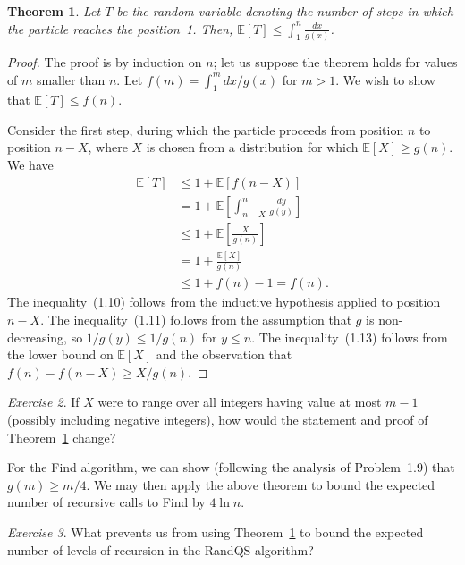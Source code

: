 \documentclass[twoside,12pt]{book}
\theoremstyle{plain}
\newtheorem{theorem}{Theorem}[chapter]
\theoremstyle{definition}
\theoremstyle{remark}
\newtheorem{exercise}[theorem]{Exercise}
\begin{document}
\begin{theorem}
\label{thm:recurrence}
Let $T$ be the random variable denoting the number of steps in which the
particle reaches the position~1.  Then,
$\mathbb{E}[T]\le \displaystyle\int_1^n \frac{dx}{g(x)}$.
\end{theorem}

\begin{proof}
The proof is by induction on $n$; let us suppose the theorem holds for values
of $m$ smaller than $n$.  Let $f(m)=\int_1^m dx/g(x)$ for $m>1$.  We wish
to show that $\mathbb{E}[T]\le f(n)$.

Consider the first step, during which the particle proceeds from position $n$
to position $n-X$, where $X$ is chosen from a distribution for which
$\mathbb{E}[X]\ge g(n)$.  We have
\begin{align}
  \mathbb{E}[T]
  &\le 1 + \mathbb{E}[f(n-X)]
    \tag{1.9}\\
  &= 1 + \mathbb{E}\!\left[\int_{n-X}^{n}\frac{dy}{g(y)}\right]
    \tag{1.10}\\
  &\le 1 + \mathbb{E}\!\left[\frac{X}{g(n)}\right]
    \tag{1.11}\\
  &= 1 + \frac{\mathbb{E}[X]}{g(n)}
    \tag{1.12}\\
  &\le 1 + f(n) - 1 = f(n).
    \tag{1.13}
\end{align}
The inequality~(1.10) follows from the inductive hypothesis applied to
position $n-X$.  The inequality~(1.11) follows from the assumption that $g$
is non-decreasing, so $1/g(y)\le 1/g(n)$ for $y\le n$.  The
inequality~(1.13) follows from the lower bound on $\mathbb{E}[X]$ and the
observation that $f(n)-f(n-X)\ge X/g(n)$.
\end{proof}

\begin{exercise}
If $X$ were to range over all integers having value at most $m-1$ (possibly
including negative integers), how would the statement and proof of
Theorem~\ref{thm:recurrence} change?
\end{exercise}

For the Find algorithm, we can show (following the analysis of Problem~1.9)
that $g(m)\ge m/4$.  We may then apply the above theorem to bound the
expected number of recursive calls to Find by $4\ln n$.

\begin{exercise}
What prevents us from using Theorem~\ref{thm:recurrence} to bound the
expected number of levels of recursion in the RandQS algorithm?
\end{exercise}
\end{document}
